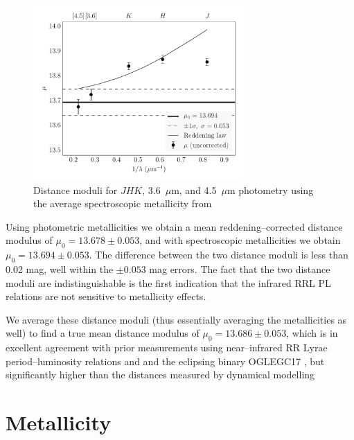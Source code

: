 \documentclass[a4paper,fleqn,usenatbib]{mnras}
\begin{document}
\begin{figure}
\begin{center}
\includegraphics[width=80mm]{final_plots/multiwavelength_distance_samestars_spect.pdf}
\caption{Distance moduli for $J\!H\!K$, 3.6~$\mu$m, and 4.5~$\mu$m photometry using the average spectroscopic metallicity from \citet{2006ApJ...640L..43S}}
\label{fig:omegaCen_dist_spect}
\end{center}
\end{figure}

Using photometric metallicities we obtain a mean reddening--corrected distance modulus of $\mu_0 = 13.678 \pm 0.053$, and with spectroscopic metallicities we obtain $\mu_0 = 13.694 \pm 0.053$.
The difference between the two distance moduli is less than 0.02 mag, well within the $\pm 0.053$ mag errors. The fact that the two distance moduli are indistinguishable is the first indication that the infrared RRL PL relations are not sensitive to metallicity effects.

We average these distance moduli (thus essentially averaging the metallicities as well) to find a true mean distance modulus of $\mu_0 = 13.686 \pm 0.053$, which is in excellent agreement with prior measurements using near--infrared RR Lyrae period--luminosity relations \citep{2006ApJ...652..362D} and and the eclipsing binary OGLEGC17 \citep{2001AJ....121.3089T}, but significantly higher than the distances measured by dynamical modelling \citep{2006A&A...445..513V,
2013MNRAS.436.2598W}

\section{Metallicity}
\label{sec:metallicity}


\end{document}
